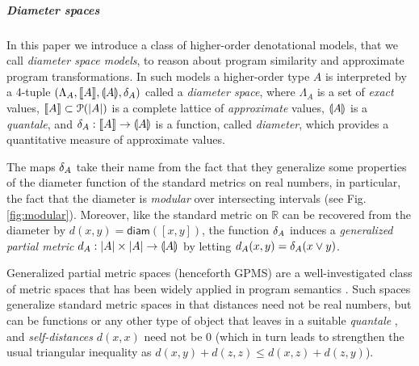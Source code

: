 





\subparagraph*{Diameter spaces}



In this paper we introduce a class of higher-order denotational models, that we call \emph{diameter space models}, to reason about program similarity and approximate program transformations.
In such models a higher-order type $A$ is interpreted by a 4-tuple $(\Lambda_A, \llbracket A \rrbracket, \llparenthesis A \rrparenthesis, \delta_{A})$ called a \emph{diameter space}, where $\Lambda_A$ is a set of \emph{exact} values, $\llbracket A \rrbracket\subset \mathcal P(|A|)$ is a complete lattice of \emph{approximate} values, $\llparenthesis A \rrparenthesis$ is a \emph{quantale}, and $\delta_{A}: \llbracket A \rrbracket\to \llparenthesis A \rrparenthesis$ is a function, called \emph{diameter}, which provides a quantitative measure of approximate values.





The maps $\delta_{A}$ take their name from the fact that they  
 generalize some properties of the diameter function of the standard metrics on real numbers, in particular, 
the fact that the diameter is \emph{modular} over intersecting intervals (see Fig. \ref{fig:modular}).
Moreover, like the standard metric on $\mathbb R$ can be recovered from the diameter by $d(x,y)=\mathsf{diam}([x,y])$, the function $\delta_{A}$ induces a \emph{generalized partial metric} $d_{A}:|A|\times |A|\to \llparenthesis A \rrparenthesis$ by letting $d_{A}(x,y)=\delta_{A}(x\vee y)$. 


Generalized partial metric spaces (henceforth GPMS) are a well-investigated class of metric spaces that has been widely applied in program semantics \cite{bkmp:partial-metrics, Bukatin1997, doi:10.1111/j.1749-6632.1994.tb44144.x, Schellekens2004, Samet:2013aa, Stubbe2018, HE201999}. 
Such spaces generalize standard metric spaces in that distances
need not be real numbers, but can be functions or any other type of object that leaves in a suitable \emph{quantale} \cite{Hofmann2014}, and \emph{self-distances} $d(x,x)$ need not be $0$ (which in turn leads to strengthen the usual triangular inequality as $d(x,y) + d(z,z)\leq d(x,z)+d(z,y)$).


